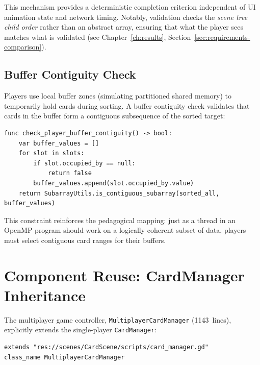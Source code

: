 This mechanism provides a deterministic completion criterion independent of UI animation state and network timing. Notably, validation checks the \emph{scene tree child order} rather than an abstract array, ensuring that what the player sees matches what is validated (see Chapter~\ref{ch:results}, Section~\ref{sec:requirements-comparison}).

\subsection{Buffer Contiguity Check}
\label{subsec:buffer-contiguity}

Players use local buffer zones (simulating partitioned shared memory) to temporarily hold cards during sorting. A buffer contiguity check validates that cards in the buffer form a contiguous subsequence of the sorted target:

\begin{lstlisting}[caption={Buffer contiguity validation (card\_manager.gd, line 693)}]
func check_player_buffer_contiguity() -> bool:
    var buffer_values = []
    for slot in slots:
        if slot.occupied_by == null:
            return false
        buffer_values.append(slot.occupied_by.value)
    return SubarrayUtils.is_contiguous_subarray(sorted_all, buffer_values)
\end{lstlisting}

This constraint reinforces the pedagogical mapping: just as a thread in an OpenMP program should work on a logically coherent subset of data, players must select contiguous card ranges for their buffers.

\section{Component Reuse: CardManager Inheritance}
\label{sec:component-reuse}

The multiplayer game controller, \texttt{MultiplayerCardManager} (1143~lines), explicitly extends the single-player \texttt{CardManager}:

\begin{lstlisting}[caption={Multiplayer extension declaration (multiplayer\_card\_manager.gd, line 1)}]
extends "res://scenes/CardScene/scripts/card_manager.gd"
class_name MultiplayerCardManager
\end{lstlisting}

